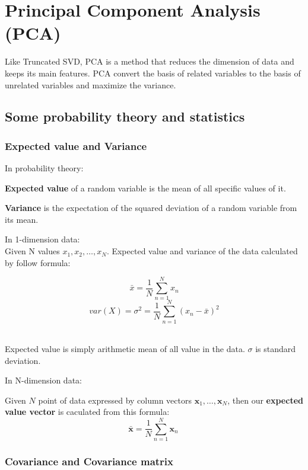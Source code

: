 \documentclass[a4paper, 12pt]{report}
\begin{document}
\chapter{\Large Principal Component Analysis (PCA)}
\indent \par Like Truncated SVD, PCA is a method that reduces the dimension of data and keeps its main features. PCA convert the basis of related variables to the basis of unrelated variables and maximize the variance.
\section{Some probability theory and statistics}
\subsection{Expected value and Variance}
In probability theory:

\textbf{Expected value} of a random variable is the mean of all specific values of it.

\textbf{Variance} is the expectation of the squared deviation of a random variable from its mean.

In 1-dimension data:\\
Given N values $x_1, x_2, \dots, x_N$. Expected value and variance of the data calculated by follow formula:

\begin{equation*}
\bar{x} = \frac{1}{N}\sum_{n=1}^N x_n
\end{equation*}
\begin{equation*}
var(X)=\sigma^2 = \frac{1}{N} \sum_{n=1}^N (x_n - \bar{x})^2
\end{equation*}\\
\indent \par Expected value is simply arithmetic mean of all value in the data. $\sigma$ is standard deviation.

In N-dimension data:\\
\indent \par Given $N$ point of data expressed by column vectors $\mathbf{x}_1, \dots, \mathbf{x}_N$, then our \textbf{expected value vector} is caculated from this formula:
\begin{equation*}
\bar{\mathbf{x}} = \frac{1}{N} \sum_{n=1}^N \mathbf{x}_n \ 
\end{equation*}

\subsection{Covariance and Covariance matrix}
\end{document}
